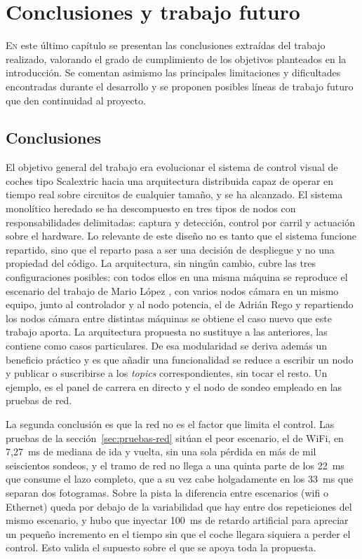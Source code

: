 \chapter{Conclusiones y trabajo futuro}
\label{cap:conclusiones}

\lettrine{E}{n} este último capítulo se presentan las conclusiones extraídas del trabajo realizado, valorando el grado de cumplimiento de los objetivos planteados en la introducción. Se comentan asimismo las principales limitaciones y dificultades encontradas durante el desarrollo y se proponen posibles líneas de trabajo futuro que den continuidad al proyecto.

\section{Conclusiones}
\label{sec:conclusiones}

El objetivo general del trabajo era evolucionar el sistema de control visual de coches tipo Scalextric hacia una arquitectura distribuida capaz de operar en tiempo real sobre circuitos de cualquier tamaño, y se ha alcanzado. El sistema monolítico heredado se ha descompuesto en tres tipos de nodos con responsabilidades delimitadas: captura y detección, control por carril y actuación sobre el hardware. Lo relevante de este diseño no es tanto que el sistema funcione repartido, sino que el reparto pasa a ser una decisión de despliegue y no una propiedad del código. La arquitectura, sin ningún cambio, cubre las tres configuraciones posibles: con todos ellos en una misma máquina se reproduce el escenario del trabajo de Mario López \cite{tfgmario}, con varios nodos cámara en un mismo equipo, junto al controlador y al nodo potencia, el de Adrián Rego \cite{tfgadrian} y repartiendo los nodos cámara entre distintas máquinas se obtiene el caso nuevo que este trabajo aporta. La arquitectura propuesta no sustituye a las anteriores, las contiene como casos particulares. De esa modularidad se deriva además un beneficio práctico y es que añadir una funcionalidad se reduce a escribir un nodo y publicar o suscribirse a los \emph{topics} correspondientes, sin tocar el resto. Un ejemplo, es el panel de carrera en directo y el nodo de sondeo empleado en las pruebas de red.

La segunda conclusión es que la red no es el factor que limita el control. Las pruebas de la sección~\ref{sec:pruebas-red} sitúan el peor escenario, el de WiFi, en 7,27~ms de mediana de ida y vuelta, sin una sola pérdida en más de mil seiscientos sondeos, y el tramo de red no llega a una quinta parte de los 22~ms que consume el lazo completo, que a su vez cabe holgadamente en los 33~ms que separan dos fotogramas. Sobre la pista la diferencia entre escenarios (wifi o Ethernet) queda por debajo de la variabilidad que hay entre dos repeticiones del mismo escenario, y hubo que inyectar 100~ms de retardo artificial para apreciar un pequeño incremento en el tiempo sin que el coche llegara siquiera a perder el control. Esto valida el supuesto sobre el que se apoya toda la propuesta.

